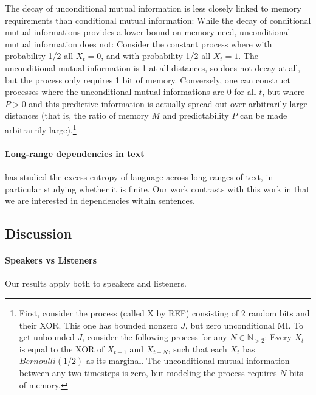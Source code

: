 \documentclass[11pt,letterpaper]{article}
\begin{document}
The decay of unconditional mutual information is less closely linked to memory requirements than conditional mutual information:
While the decay of conditional mutual informations provides a lower bound on memory need, unconditional mutual information does not:
Consider the constant process where with probability 1/2 all $X_t = 0$, and with probability 1/2 all $X_t = 1$. %
The unconditional mutual information is 1 at all distances, so does not decay at all, but the process only requires 1 bit of memory.
Conversely, one can construct processes where the unconditional mutual informations are 0 for all $t$, but where $P > 0$ and this predictive information is actually spread out over arbitrarily large distances (that is, the ratio of memory $M$ and predictability $P$ can be made arbitrarrily large).\footnote{First, consider the process (called X by REF) consisting of 2 random bits and their XOR. This one has bounded nonzero $J$, but zero unconditional MI. To get unbounded $J$, consider the following process for any $N \in \mathbb{N}_{>2}$: Every $X_t$ is equal to the XOR of $X_{t-1}$ and $X_{t-N}$, such that each $X_t$ has $Bernoulli(1/2)$ as its marginal. The unconditional mutual information between any two timesteps is zero, but modeling the process requires $N$ bits of memory.}



\paragraph{Long-range dependencies in text}    %
\cite{debowski-excess-2011} has studied the excess entropy of language across long ranges of text, in particular studying whether it is finite. %
Our work contrasts with this work in that we are interested in dependencies within sentences.


\subsection{Discussion}

\paragraph{Speakers vs Listeners}
Our results apply both to speakers and listeners.
\end{document}

